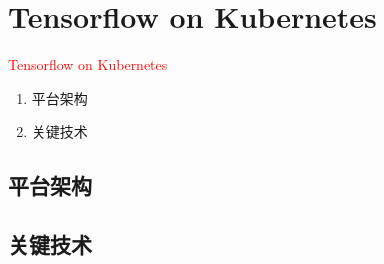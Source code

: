 \section{Tensorflow on Kubernetes}
\label{sec:tensorflow-on-kubernetes}

\begin{frame}
  \begin{center}
    \Huge{\textcolor{red}{Tensorflow on Kubernetes}}
  \end{center}

  \begin{enumerate}
    \item \alert{平台架构}
    \item \alert{关键技术}
  \end{enumerate}    
\end{frame}

\subsection{平台架构}

\subsection{关键技术}

